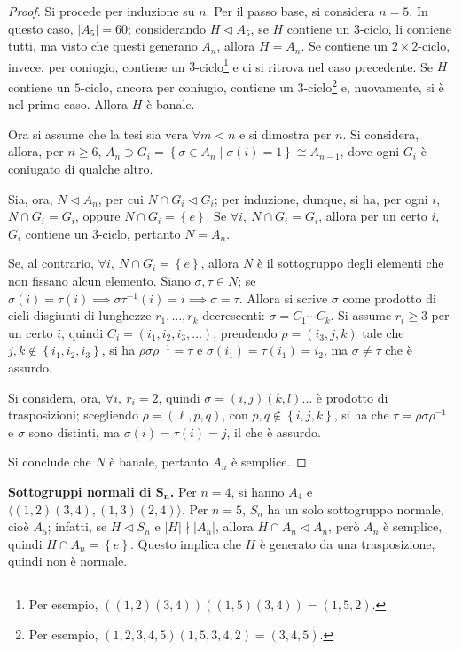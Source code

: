 \documentclass[11pt]{article}
\theoremstyle{style}
\numberwithin{equation}{subsection}
\renewcommand{\textbf}[1]{\textsf{\bfseries #1}}
\begin{document}
	\begin{proof}
Si procede per induzione su $n$.
Per il passo base, si considera $n=5$. 
In questo caso, $\lvert A_5 \rvert =60$; considerando $H \lhd A_5$, se $H$ contiene un $3$-ciclo, li contiene tutti, ma visto che questi generano $A_n$, allora $H = A_n$.
Se contiene un $2\times 2$-ciclo, invece, per coniugio, contiene un $3$-ciclo\footnote{Per esempio, $((1,2)(3,4))((1,5)(3,4)) = (1,5,2)$.} e ci si ritrova nel caso precedente.
Se $H$ contiene un $5$-ciclo, ancora per coniugio, contiene un $3$-ciclo\footnote{Per esempio, $(1,2,3,4,5) (1,5,3,4,2) = (3,4,5)$.} e, nuovamente, si \`e nel primo caso.
Allora $H$ \`e banale.

Ora si assume che la tesi sia vera $\forall m < n$ e si dimostra per $n$.
Si considera, allora, per $n\ge 6$, $A_n \supset G_i = \left\{ \sigma \in A_n  \mid \sigma (i) = 1 \right\} \cong A_{n-1} $, dove ogni $G_i$ \`e coniugato di qualche altro.

Sia, ora, $N \lhd A_n$, per cui $N\cap G_i \lhd G_i$; per induzione, dunque, si ha, per ogni $i$, $N\cap G_i = G_i$, oppure $N\cap G_i = \left\{ e \right\} $.
Se $\forall i, \ N\cap G_i = G_i$, allora per un certo $i$, $G_i$ contiene un $3$-ciclo, pertanto $N = A_n$.

Se, al contrario, $\forall i,\ N\cap G_i = \left\{ e \right\} $, allora $N$ \`e il sottogruppo degli elementi che non fissano alcun elemento.
Siano $\sigma , \tau  \in N$; se $\sigma (i) = \tau  (i) \implies \sigma \tau ^{-1}(i) = i\implies \sigma =\tau $.
Allora si scrive $\sigma $ come prodotto di cicli disgiunti di lunghezze $r_1,\ldots,r_k$ decrescenti: $\sigma  = C_1\cdots C_k$.
Si assume $r_i \ge 3$ per un certo $i$, quindi $C_i= (i_1,i_2,i_3,\ldots)$; prendendo $\rho =(i_3,j,k)$ tale che $j,k \not \in \left\{ i_1,i_2,i_3 \right\} $, si ha $\rho \sigma \rho ^{-1}= \tau $ e $\sigma (i_1) = \tau (i_1)= i_2$, ma $\sigma \neq \tau $ che \`e assurdo.

Si considera, ora, $\forall i, \ r_i=2$, quindi $\sigma = (i,j)(k,l)\ldots$ \`e prodotto di trasposizioni; scegliendo $\rho =(\ell ,p,q)$, con $p,q \not \in \left\{ i,j,k \right\} $, si ha che $\tau  = \rho \sigma \rho ^{-1}$ e $\sigma $ sono distinti, ma $\sigma (i) = \tau (i) = j$, il che \`e assurdo.

Si conclude che $N$ \`e banale, pertanto $A_n$ \`e semplice.
	\end{proof}

\textbf{Sottogruppi normali di $\mathbf{S_n} $.} Per $n=4$, si hanno $A_4$ e $\langle (1,2)(3,4),(1,3)(2,4) \rangle$.
Per $n=5$, $S_n$ ha un solo sottogruppo normale, cio\`e $A_5$; infatti, se $H\lhd S_n$ e $|H|\nmid |A_n|$, allora $H\cap A_n \lhd A_n$, per\`o $A_n$ \`e semplice, quindi $H\cap A_n = \left\{ e \right\} $.
Questo implica che $H$ \`e generato da una trasposizione, quindi non \`e normale.
\end{document}
